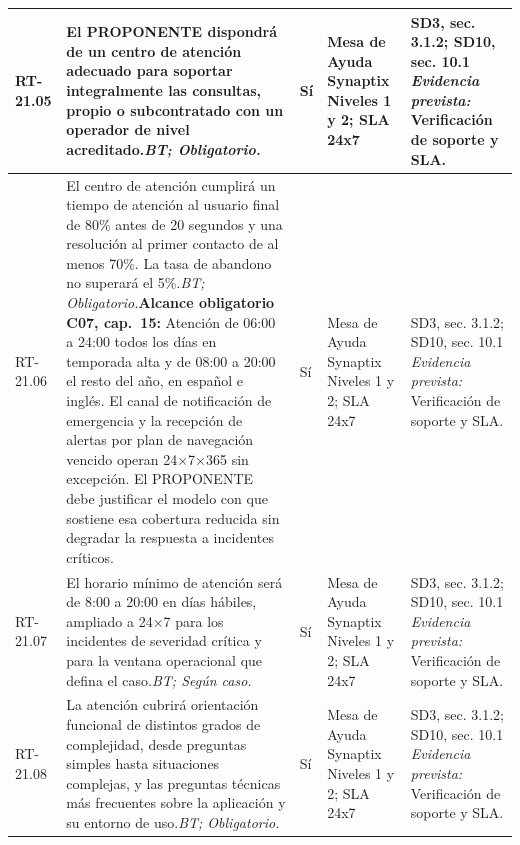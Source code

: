 \begin{paginaHorizontalSynaptix}
\begin{longtable}{|L{0.09\AnchoMatrizTDoce}|L{0.385\AnchoMatrizTDoce}|L{0.065\AnchoMatrizTDoce}|L{0.18\AnchoMatrizTDoce}|L{0.28\AnchoMatrizTDoce}|}
RT-\allowbreak{}21.\allowbreak{}05 &
El PROPONENTE dispondrá de un centro de atención adecuado para soportar integralmente las consultas, propio o subcontratado con un operador de nivel acreditado.\newline\textit{BT; Obligatorio.} &
Sí &
Mesa de Ayuda Synaptix Niveles 1 y 2; SLA 24x7 &
SD3, sec. 3.1.2; SD10, sec. 10.1 \newline\textit{Evidencia prevista:} Verificación de soporte y SLA. \\ \hline

RT-\allowbreak{}21.\allowbreak{}06 &
El centro de atención cumplirá un tiempo de atención al usuario final de 80\% antes de 20 segundos y una resolución al primer contacto de al menos 70\%. La tasa de abandono no superará el 5\%.\newline\textit{BT; Obligatorio.}\newline\textbf{Alcance obligatorio C07, cap.~15:} Atención de 06:00 a 24:00 todos los días en temporada alta y de 08:00 a 20:00 el resto del año, en español e inglés. El canal de notificación de emergencia y la recepción de alertas por plan de navegación vencido operan 24×7×365 sin excepción. El PROPONENTE debe justificar el modelo con que sostiene esa cobertura reducida sin degradar la respuesta a incidentes críticos. &
Sí &
Mesa de Ayuda Synaptix Niveles 1 y 2; SLA 24x7 &
SD3, sec. 3.1.2; SD10, sec. 10.1 \newline\textit{Evidencia prevista:} Verificación de soporte y SLA. \\ \hline

RT-\allowbreak{}21.\allowbreak{}07 &
El horario mínimo de atención será de 8:00 a 20:00 en días hábiles, ampliado a 24×7 para los incidentes de severidad crítica y para la ventana operacional que defina el caso.\newline\textit{BT; Según caso.} &
Sí &
Mesa de Ayuda Synaptix Niveles 1 y 2; SLA 24x7 &
SD3, sec. 3.1.2; SD10, sec. 10.1 \newline\textit{Evidencia prevista:} Verificación de soporte y SLA. \\ \hline

RT-\allowbreak{}21.\allowbreak{}08 &
La atención cubrirá orientación funcional de distintos grados de complejidad, desde preguntas simples hasta situaciones complejas, y las preguntas técnicas más frecuentes sobre la aplicación y su entorno de uso.\newline\textit{BT; Obligatorio.} &
Sí &
Mesa de Ayuda Synaptix Niveles 1 y 2; SLA 24x7 &
SD3, sec. 3.1.2; SD10, sec. 10.1 \newline\textit{Evidencia prevista:} Verificación de soporte y SLA. \\ \hline


\end{longtable}
\end{paginaHorizontalSynaptix}
